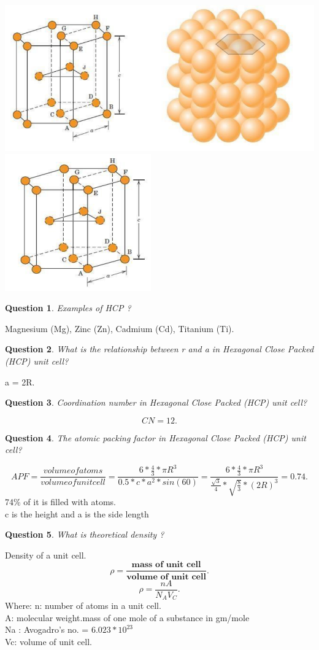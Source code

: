 \documentclass[13]{article}
\newtheorem{exer}{Question}
\begin{document}
\begin{center}
\includegraphics[scale=0.5]{figures/12.png} \includegraphics[scale=0.5]{figures/13.png}
\end{center}

\begin{exer}
Examples of HCP ?
\end{exer}
Magnesium (Mg), Zinc (Zn), Cadmium (Cd), Titanium (Ti).
\begin{exer}
What is the relationship between r and a in  Hexagonal Close Packed (HCP) unit cell?
\end{exer}
a = 2R.
\begin{exer}
Coordination number in  Hexagonal Close Packed (HCP) unit cell?
\end{exer}
\[
CN=12
.\] 
\begin{exer}
The atomic packing factor in  Hexagonal Close Packed (HCP) unit cell?
\end{exer}
\[
	APF = \frac{volume of atoms}{volume of unit cell} = \frac{6* \frac{4}{3} * \pi R^3}{0.5*c*a^2*sin(60)}= \frac{6* \frac{4}{3} * \pi R^3}{ \frac{\sqrt{3}}{4} * \sqrt{ \frac{8}{3}}*(2R)^3  } = 0.74
.\] 
74\% of it is filled with atoms. 
\\ c is the height and a is the side length
\begin{exer}
What is theoretical density ?
\end{exer}
Density of a unit cell. 
\[
	\rho = \frac{\textbf{mass of unit cell}}{ \textbf{volume of unit cell} }  
.\]
\[
\rho = \frac{nA}{N_AV_C} 
.\] 
Where: n: number of atoms in a unit cell. \\
A: molecular weight.mass of one mole of a substance in gm/mole \\
Na : Avogadro's  no. =  $6.023*10^{23}$\\
Vc: volume of unit cell. 
\end{document}
